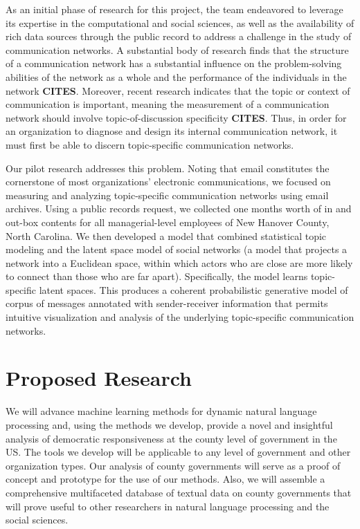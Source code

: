 As an initial phase of research for this project, the team endeavored to leverage its expertise in the computational and social sciences, as well as the availability of rich data sources through the public record to address a challenge in the study of communication networks. A substantial body of research finds that the structure of a communication network has a substantial influence on the problem-solving abilities of the network as a whole and the performance of the individuals in the network {\bf CITES}. Moreover, recent research indicates that the topic or context of communication is important, meaning the measurement of a communication network should involve topic-of-discussion specificity {\bf CITES}. Thus, in order for an organization to diagnose and design its internal communication network, it must first be able to discern topic-specific communication networks.

Our pilot research addresses this problem. Noting that email constitutes the cornerstone of most organizations' electronic communications, we focused on measuring and analyzing topic-specific communication networks using email archives. Using a public records request, we collected one months worth of in and out-box contents for all managerial-level employees of New Hanover County, North Carolina. We then developed a model that combined statistical topic modeling and the latent space model of social networks (a model that projects a network into a Euclidean space, within which actors who are close are more likely to connect than those who are far apart). Specifically, the model learns topic-specific latent spaces. This produces a coherent probabilistic generative model of corpus of messages annotated with sender-receiver information that permits intuitive visualization and analysis of the underlying topic-specific communication networks.

\section{Proposed Research}

We will advance machine learning methods for dynamic natural language processing and, using the methods we develop, provide a novel and insightful analysis of democratic responsiveness at the county level of government in the US. The tools we develop will be applicable to any level of government and other organization types. Our analysis of county governments will serve as a proof of concept and prototype for the use of our methods. Also, we will assemble a comprehensive multifaceted database of textual data on county governments that will prove useful to other researchers in natural language processing and the social sciences.

